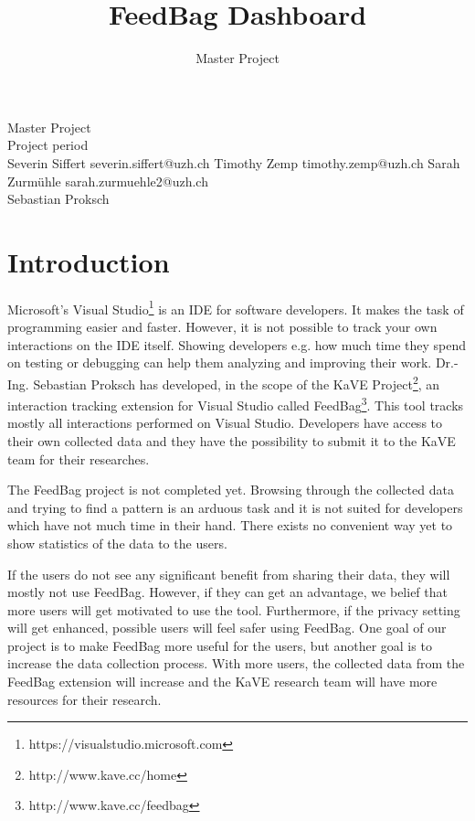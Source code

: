 \documentclass{seal_article}
\title{FeedBag Dashboard}
\subtitle{Master Project}
\begin{document}
\maketitle

\iftexshop
\setprotcode\font
{\it \setprotcode \font}
{\bf \setprotcode \font}
{\bf \it \setprotcode \font}
\fi

\noindent Master Project\\
\noindent Project period\\
\noindent Severin Siffert \newline severin.siffert@uzh.ch \newline Timothy Zemp \newline timothy.zemp@uzh.ch \newline Sarah Zurmühle \newline sarah.zurmuehle2@uzh.ch\\
\noindent Sebastian Proksch

\section{Introduction}
Microsoft’s Visual Studio\footnote{​https://visualstudio.microsoft.com} is an IDE for software developers. It makes the task of programming easier and faster. However, it is not possible to track your own interactions on the IDE itself. Showing developers e.g. how much time they spend on testing or debugging can help them analyzing and improving their work. Dr.-Ing. Sebastian Proksch has developed, in the scope of the ​KaVE Project\footnote{​http://www.kave.cc/home}, an interaction tracking extension for Visual Studio called ​FeedBag\footnote{ ​http://www.kave.cc/feedbag}. This tool tracks mostly all interactions performed on Visual Studio. Developers have access to their own collected data and they have the possibility to submit it to the KaVE team for their researches.

The FeedBag project is not completed yet. Browsing through the collected data and trying to find a pattern is an arduous task and it is not suited for developers which have not much time in their hand. There exists no convenient way yet to show statistics of the data to the users.

If the users do not see any significant benefit from sharing their data, they will mostly not use FeedBag. However, if they can get an advantage, we belief that more users will get motivated to use the tool. Furthermore, if the privacy setting will get enhanced, possible users will feel safer using FeedBag. One goal of our project is to make FeedBag more useful for the users, but another goal is to increase the data collection process. With more users, the collected data from the FeedBag extension will increase and the KaVE research team will have more resources for their research.
\end{document}
